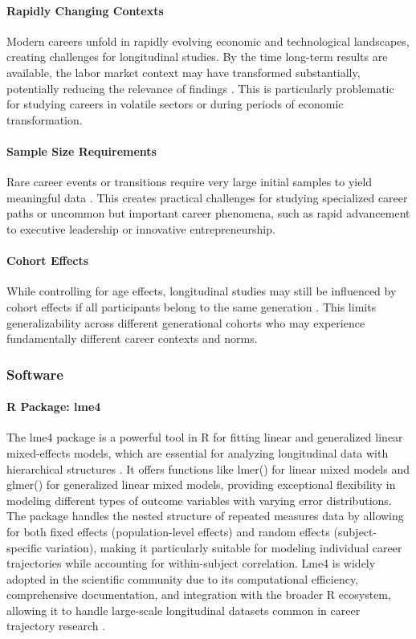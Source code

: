 \documentclass[../main.tex]{subfiles}
\begin{document}
\paragraph{Rapidly Changing Contexts}
Modern careers unfold in rapidly evolving economic and technological landscapes, creating challenges for longitudinal studies. By the time long-term results are available, the labor market context may have transformed substantially, potentially reducing the relevance of findings \parencite{endvaw2024longitudinal}. This is particularly problematic for studying careers in volatile sectors or during periods of economic transformation.

\paragraph{Sample Size Requirements}
Rare career events or transitions require very large initial samples to yield meaningful data \parencite{endvaw2024longitudinal}. This creates practical challenges for studying specialized career paths or uncommon but important career phenomena, such as rapid advancement to executive leadership or innovative entrepreneurship.

\paragraph{Cohort Effects}
While controlling for age effects, longitudinal studies may still be influenced by cohort effects if all participants belong to the same generation \parencite{caruana2015longitudinal, wikipedia2024longitudinal}. This limits generalizability across different generational cohorts who may experience fundamentally different career contexts and norms.

\subsubsection{Software}

\paragraph{R Package: lme4}
The lme4 package is a powerful tool in R for fitting linear and generalized linear mixed-effects models, which are essential for analyzing longitudinal data with hierarchical structures \parencite{lme4slides2011}. It offers functions like lmer() for linear mixed models and glmer() for generalized linear mixed models, providing exceptional flexibility in modeling different types of outcome variables with varying error distributions. The package handles the nested structure of repeated measures data by allowing for both fixed effects (population-level effects) and random effects (subject-specific variation), making it particularly suitable for modeling individual career trajectories while accounting for within-subject correlation. Lme4 is widely adopted in the scientific community due to its computational efficiency, comprehensive documentation, and integration with the broader R ecosystem, allowing it to handle large-scale longitudinal datasets common in career trajectory research \parencite{lme4slides2011}.
\end{document}
